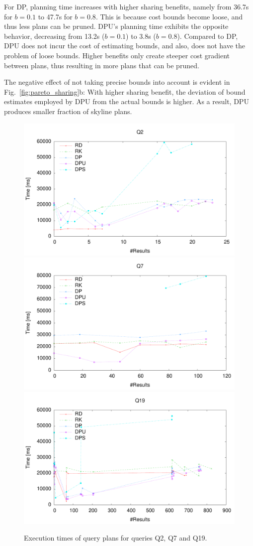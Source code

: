 For DP, planning time increases with higher sharing
benefits, namely from 36.7s for $b=0.1$ to 47.7s for $b=0.8$.  This is because cost bounds
become loose, and thus less plans can be pruned. 
DPU's planning time exhibits the opposite behavior, decreasing from 13.2s ($b=0.1$) to 3.8s
($b=0.8$). Compared to DP, DPU does not incur the cost of estimating bounds, and also, does not have the problem of loose bounds. Higher benefits only create steeper cost gradient
between plans, thus resulting in more plans that can be pruned.

The negative effect of not taking precise bounds into account is evident in Fig.~\ref{fig:pareto_sharing}b: With higher sharing benefit, the deviation of bound estimates employed by DPU from the actual bounds is higher. As a result, DPU produces smaller fraction of skyline plans. 


\begin{figure}[htb]
  \centering
  \includegraphics[width=0.32\linewidth]{figs/pareto_exec_0_q2.pdf}
  \includegraphics[width=0.32\linewidth]{figs/pareto_exec_0_q7.pdf}
  \includegraphics[width=0.32\linewidth]{figs/pareto_exec_0_q19.pdf}
  \caption{Execution times of query plans for queries Q2, Q7 and Q19.}
  \label{fig:exec}
\end{figure}


